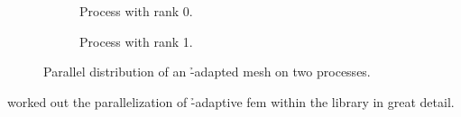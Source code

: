 \begin{figure}
\begin{subfigure}[t]{.35\textwidth}
  \centering
  
  \caption{Process with rank 0.}
\end{subfigure}
\begin{subfigure}[t]{.35\textwidth}
  \centering
  
  \caption{Process with rank 1.}
\end{subfigure}
\begin{minipage}[t]{.28\textwidth}
  \centering
  
\end{minipage}
\caption{Parallel distribution of an \h-adapted mesh on two processes.}
\label{fig:paralleldistribution}
\end{figure}




\textcite{bangerth2012} worked out the parallelization of \h-adaptive \gls{fem} within the \dealii{} library in great detail.